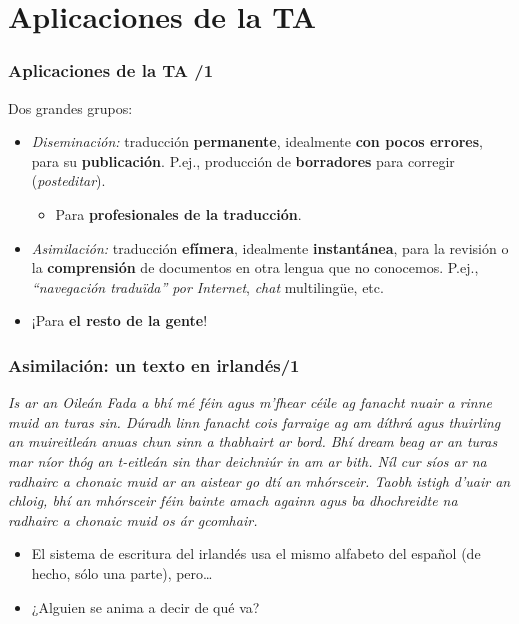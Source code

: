 \documentclass{beamer}
\newcommand{\empha}[1]{\emph{#1}\/}
\begin{document}

\section{Aplicaciones de la TA}
\begin{frame}
\frametitle{Aplicaciones de la TA /1}


Dos grandes grupos:
\begin{itemize} 

\item\empha{Diseminación:} traducción \textbf{permanente}, idealmente
  \textbf{con pocos errores}, para su  \textbf{publicación}. P.ej.,
  producción de \textbf{borradores} para corregir
  (\textit{posteditar}).
\begin{itemize}
\item Para \textbf{profesionales de la traducción}.
\end{itemize}

\item\empha{Asimilación:} traducción \textbf{efímera}, idealmente
  \textbf{instantánea}, para la revisión o la \textbf{comprensión} de
  documentos en otra lengua que no conocemos. P.ej.,
  \empha{``navegación traduïda'' por Internet}, \textit{chat}
  multilingüe, etc.
\item ¡Para \textbf{el resto de la gente}!

\end{itemize}

\end{frame}
\begin{frame}
  \frametitle{Asimilación: un texto en irlandés/1}

  \empha{Is ar an Oileán Fada a bhí mé féin agus m’fhear céile ag fanacht
  nuair a rinne muid an turas sin. Dúradh linn fanacht cois farraige
  ag am díthrá agus thuirling an muireitleán anuas chun sinn a
  thabhairt ar bord. Bhí dream beag ar an turas mar níor thóg an
  t-eitleán sin thar deichniúr in am ar bith. Níl cur síos ar na
  radhairc a chonaic muid ar an aistear go dtí an mhórsceir.  Taobh
  istigh d’uair an chloig, bhí an mhórsceir féin bainte amach againn
  agus ba dhochreidte na radhairc a chonaic muid os ár gcomhair.}
\begin{itemize}
\item El sistema de escritura del irlandés usa el mismo alfabeto del
  español (de hecho, sólo una parte), pero\ldots
\item ¿Alguien se anima a decir de qué va?

\end{itemize}
  \end{frame}
\end{document}
